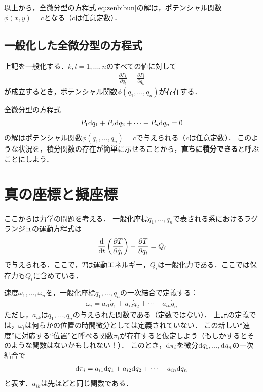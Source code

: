 \documentclass[a4j,10pt]{jsarticle}
\newcommand{\bbn}[2]{\frac{{\rm {\rm d}} #1}{{\rm {\rm d}} #2}}
\begin{document}
以上から，全微分型の方程式\eqref{eq:zenbibun}の解は，ポテンシャル関数$\phi(x,y)=c$となる（$c$は任意定数）．

\subsection{一般化した全微分型の方程式}
上記を一般化する．$k,l=1,...,n$のすべての値に対して
\begin{align}
    \frac{\partial P_k}{\partial q_l} = \frac{\partial P_l}{\partial q_k}
\end{align}
が成立するとき，ポテンシャル関数$\phi(q_1,...,q_n)$が存在する．

全微分型の方程式
\begin{align}
    P_1 {\rm d} q_1 + P_2 {\rm d} q_2 + \cdots + P_n {\rm d} q_n=0
\end{align}
の解はポテンシャル関数$\phi(q_1,...,q_n)=c$で与えられる（$c$は任意定数）．
このような状況を，積分関数の存在が簡単に示せることから，\textbf{直ちに積分できる}と呼ぶことにしよう．

\section{真の座標と擬座標}
ここからは力学の問題を考える．
一般化座標$q_1,...,q_n$で表される系におけるラグランジュの運動方程式は
\begin{align}
    \bbn{}{t}\left(\frac{\partial T}{\partial \dot{q}_i}\right)-\frac{\partial T}{\partial q_i}=Q_i
    \label{eq:Lagrange_equation}
\end{align}
で与えられる．ここで，$T$は運動エネルギー，$Q_i$は一般化力である．ここでは保存力も$Q_i$に含めている．

速度$\omega_1,...,\omega_n$を，一般化座標$\dot{q}_1,...,\dot{q}_n$の一次結合で定義する：
\begin{align}
    \omega_i = a_{i1}\dot{q}_1 + a_{i2}\dot{q}_2+\cdots+a_{in}\dot{q}_n
    \label{eq:omega_definition}
\end{align}
ただし，$a_{ik}$は$q_1,...,q_n$の与えられた関数である（定数ではない）．
上記の定義では，$\omega_i$は何らかの位置の時間微分としては定義されていない．
この新しい``速度''に対応する``位置''と呼べる関数$\pi_i$が存在すると仮定しよう（もしかするとそのような関数はないかもしれない！）．
このとき，${\rm d} \pi_i$を微分${\rm d} q_1, ... ,{\rm d} q_n$の一次結合で
\begin{align}
    {\rm d}\pi_i = a_{i1}{\rm d} q_1 + a_{i2}{\rm d} q_2 + \cdots + a_{in}{\rm d} q_n
    \label{eq:derivative_of_pi}
\end{align}
と表す．$a_{ik}$は先ほどと同じ関数である．
\end{document}
